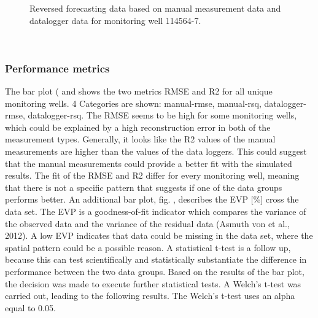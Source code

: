 \begin{figure}[htbp]
\begin{minipage}{0.32\textwidth}
        \caption{Reversed forecasting data based on manual measurement data and datalogger data for monitoring well 114564-7.}
        \label{combi}
    \end{minipage}
\end{figure} \\

\subsubsection{Performance metrics}
The bar plot ( and  shows the two metrics RMSE and R2 for all unique monitoring wells. 4 Categories are shown: manual-rmse, manual-rsq, datalogger-rmse, datalogger-rsq. The RMSE seems to be high for some monitoring wells, which could be explained by a high reconstruction error in both of the measurement types. Generally, it looks like the R2 values of the manual measurements are higher than the values of the data loggers. This could suggest that the manual measurements could provide a better fit with the simulated results. The fit of the RMSE and R2 differ for every monitoring well, meaning that there is not a specific pattern that suggests if one of the data groups performs better. An additional bar plot, fig. , describes the EVP [\%] cross the data set. The EVP is a goodness-of-fit indicator which compares the variance of the observed data and the variance of the residual data (Asmuth von et al., 2012). A low EVP indicates that data could be missing in the data set, where the spatial pattern could be a possible reason. A statistical t-test is a follow up, because this can test scientifically and statistically substantiate the difference in performance between the two data groups.  
\newline
Based on the results of the bar plot, the decision was made to execute further statistical tests. A Welch's t-test was carried out, leading to the following results. The Welch's t-test uses an alpha equal to 0.05. 

